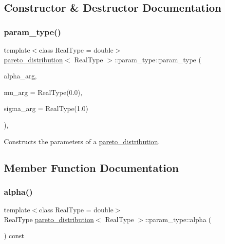 \subsection{Constructor \& Destructor Documentation}
\mbox{\label{classpareto__distribution_1_1param__type_ad7baf0b5bbef69d2ffe204e40c6db9dc}} 
\subsubsection{\texorpdfstring{param\+\_\+type()}{param\_type()}}
{\footnotesize\ttfamily template$<$class Real\+Type  = double$>$ \\
\mbox{\hyperlink{classpareto__distribution}{pareto\+\_\+distribution}}$<$ Real\+Type $>$\+::param\+\_\+type\+::param\+\_\+type (\begin{DoxyParamCaption}\item[{Real\+Type}]{alpha\+\_\+arg,  }\item[{Real\+Type}]{mu\+\_\+arg = {\ttfamily RealType(0.0)},  }\item[{Real\+Type}]{sigma\+\_\+arg = {\ttfamily RealType(1.0)} }\end{DoxyParamCaption})\hspace{0.3cm}{\ttfamily [inline]}, {\ttfamily [explicit]}}



Constructs the parameters of a \mbox{\hyperlink{classpareto__distribution}{pareto\+\_\+distribution}}. 



\subsection{Member Function Documentation}
\mbox{\label{classpareto__distribution_1_1param__type_a17ac0145e5c5ba8d7b1d30686f04a8c9}} 
\subsubsection{\texorpdfstring{alpha()}{alpha()}}
{\footnotesize\ttfamily template$<$class Real\+Type  = double$>$ \\
Real\+Type \mbox{\hyperlink{classpareto__distribution}{pareto\+\_\+distribution}}$<$ Real\+Type $>$\+::param\+\_\+type\+::alpha (\begin{DoxyParamCaption}{ }\end{DoxyParamCaption}) const\hspace{0.3cm}{\ttfamily [inline]}}



